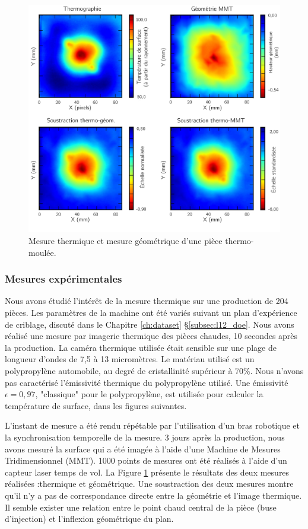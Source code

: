 \begin{figure}[tbp]
	\centering
	\includegraphics[width=\textwidth]{../Chap2/Figures/Comparaison_thermo_MMT.jpg}
	\caption{Mesure thermique et mesure géométrique d'une pièce thermo-moulée.}
	\label{fig:thermo_geom}
\end{figure}

\subsubsection{Mesures expérimentales}
Nous avons étudié l'intérêt de la mesure thermique sur une production de 204 pièces.
Les paramètres de la machine ont été variés suivant un plan d'expérience de criblage, discuté dans le Chapitre \ref{ch:dataset} §\ref{subsec:l12_doe}.
Nous avons réalisé une mesure par imagerie thermique des pièces chaudes, 10 secondes après la production.
La caméra thermique utilisée était sensible sur une plage de longueur d'ondes de 7,5 à 13 micromètres.
Le matériau utilisé est un polypropylène automobile, au degré de cristallinité supérieur à 70\%.
Nous n'avons pas caractérisé l'émissivité thermique du polypropylène utilisé.
Une émissivité $\epsilon=0,97$, "classique" pour le polypropylène, est utilisée pour calculer la température de surface, dans les figures suivantes.

L'instant de mesure a été rendu répétable par l'utilisation d'un bras robotique et la synchronisation temporelle de la mesure.
3 jours après la production, nous avons mesuré la surface qui a été imagée à l'aide d'une Machine de Mesures Tridimensionnel (MMT).
1000 points de mesures ont été réalisés à l'aide d'un capteur laser temps de vol.
La Figure \ref{fig:thermo_geom} présente le résultats des deux mesures réalisées :thermique et géométrique.
Une soustraction des deux mesures montre qu'il n'y a pas de correspondance directe entre la géométrie et l'image thermique.
Il semble exister une relation entre le point chaud central de la pièce (buse d'injection) et l'inflexion géométrique du plan.


